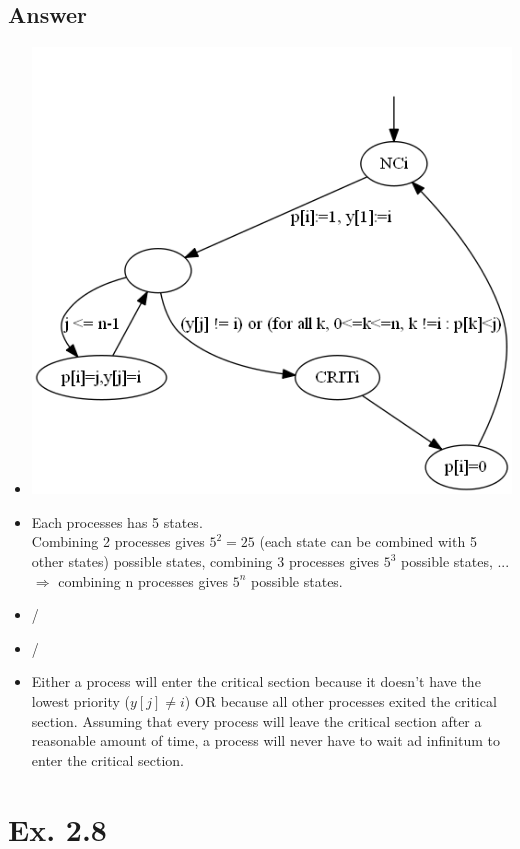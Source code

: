 \documentclass[12pt]{article}
\begin{document}
\subsection*{Answer}
\begin{itemize}
	\item \begin{centering}
		\includegraphics*[scale=0.5]{27a.png}
	\end{centering}
	\item Each processes has 5 states.\\
	Combining 2 processes gives $5^2 = 25$ (each state can be combined with 5 other states) possible states, combining 3 processes gives $5^3$ possible states, ... $\Rightarrow$ combining n processes gives $5^n$ possible states.
	\item /
	\item /
	\item Either a process will enter the critical section because it doesn't have the lowest priority ($y[j] \neq i$) OR because all other processes exited the critical section. Assuming that every process will leave the critical section after a reasonable amount of time, a process will never have to wait ad infinitum to enter the critical section.
\end{itemize}

\newpage
\section*{Ex. 2.8}
\end{document}
